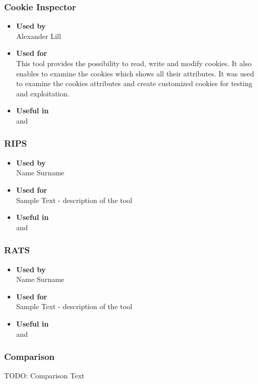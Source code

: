 \subsubsection*{Cookie Inspector}
\begin{itemize}
	\item \textbf{Used by}\\ Alexander Lill
	\item \textbf{Used for}\\
	This tool provides the possibility to read, write and modify cookies. It also enables to examine the cookies which shows all their attributes. It was used to examine the cookies attributes and create customized cookies for testing and exploitation.
	\item \textbf{Useful in}\\  and 
\end{itemize}

\subsubsection*{RIPS}
\begin{itemize}
	\item \textbf{Used by}\\ Name Surname
	\item \textbf{Used for}\\ Sample Text - description of the tool
	\item \textbf{Useful in}\\  and 
\end{itemize}

\subsubsection*{RATS}
\begin{itemize}
	\item \textbf{Used by}\\ Name Surname
	\item \textbf{Used for}\\ Sample Text - description of the tool
	\item \textbf{Useful in}\\  and 
\end{itemize}

\subsubsection*{Comparison}
TODO: Comparison Text


